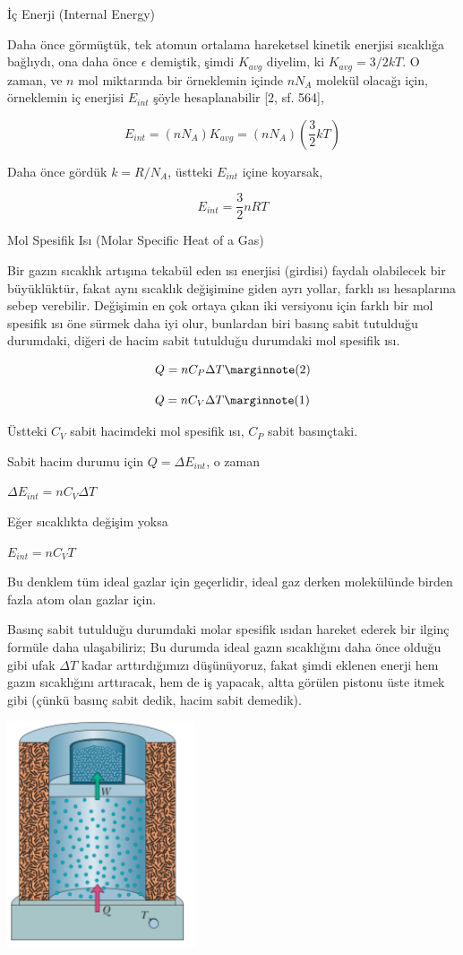 \documentclass[12pt,fleqn]{article}\usepackage{../../common}
\begin{document}
İç Enerji (Internal Energy)

Daha önce görmüştük, tek atomun ortalama hareketsel kinetik enerjisi
sıcaklığa bağlıydı, ona daha önce $\epsilon$ demiştik, şimdi $K_{avg}$
diyelim, ki $K_{avg} = 3/2 k T$. O zaman, ve $n$ mol miktarında bir
örneklemin içinde $n N_A$ molekül olacağı için, örneklemin iç
enerjisi $E_{int}$ şöyle hesaplanabilir [2, sf. 564],

$$
E_{int} = (n N_A) K_{avg} = (n N_A) (\frac{3}{2} k T)
$$

Daha önce gördük $k = R/N_A$, üstteki $E_{int}$ içine koyarsak,

$$
E_{int} = \frac{3}{2} n R T
$$

Mol Spesifik Isı (Molar Specific Heat of a Gas)

Bir gazın sıcaklık artışına tekabül eden ısı enerjisi (girdisi) faydalı
olabilecek bir büyüklüktür, fakat aynı sıcaklık değişimine giden ayrı yollar,
farklı ısı hesaplarına sebep verebilir. Değişimin en çok ortaya çıkan iki
versiyonu için farklı bir mol spesifik ısı öne sürmek daha iyi olur, bunlardan
biri basınç sabit tutulduğu durumdaki, diğeri de hacim sabit tutulduğu
durumdaki mol spesifik ısı.

$$
Q = n C_P \Delta T
\mlabel{2}
$$

$$
Q = n C_V \Delta T
\mlabel{1}
$$

Üstteki $C_V$ sabit hacimdeki mol spesifik ısı, $C_P$ sabit basınçtaki.

Sabit hacim durumu için $Q = \Delta E_{int}$, o zaman 

$\Delta E_{int} = n C_V \Delta T$

Eğer sıcaklıkta değişim yoksa 

$E_{int} = n C_V T$

Bu denklem tüm ideal gazlar için geçerlidir, ideal gaz derken molekülünde birden
fazla atom olan gazlar için.

Basınç sabit tutulduğu durumdaki molar spesifik ısıdan hareket ederek bir ilginç
formüle daha ulaşabiliriz; Bu durumda ideal gazın sıcaklığını daha önce olduğu
gibi ufak $\Delta T$ kadar arttırdığımızı düşünüyoruz, fakat şimdi eklenen
enerji hem gazın sıcaklığını arttıracak, hem de iş yapacak, altta görülen
pistonu üste itmek gibi (çünkü basınç sabit dedik, hacim sabit demedik). 

\includegraphics[width=15em]{phy_005_basics_06.png}
\end{document}
